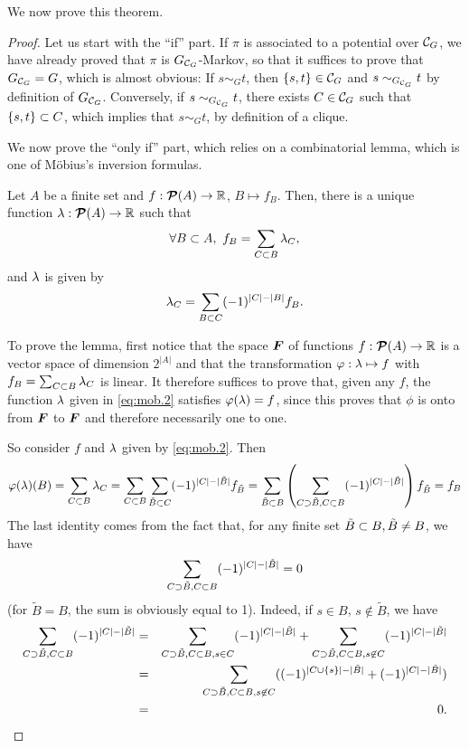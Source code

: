 We now prove this theorem.
\begin{proof}
Let us start with the ``if'' part.
If $\pi$ is associated to a potential over ${\mathcal C}_G$, we have already
proved that $\pi$ is $G_{{\mathcal C}_G}$-Markov, so that it suffices to prove
that $G_{{\mathcal C}_G} = G$, which is almost obvious: If $s\sim_G t$, then
$\{s,t\}\in {\mathcal C}_G$ and $s\sim_{G_{{\mathcal C}_G}} t$ by definition of
$G_{{\mathcal C}_G}$. Conversely, if $s\sim_{G_{{\mathcal C}_G}} t$, there exists $C\in
  {\mathcal C}_G$ such that $\{s,t\}\subset C$, which implies that $s\sim_G t$, by
  definition of a clique.

We now prove the ``only if'' part, which relies on a combinatorial lemma, which is one of
M\"obius's inversion formulas. 
\begin{lemma}
\label{lem:mobius}
Let $A$ be a finite set and $f: {\bm{\mathcal P}({A})}\to
{\mathbb{R}}$, $B\mapsto f_B$. Then, there is a unique function $\lambda: {\bm{\mathcal P}({A})} \to {\mathbb{R}}$ such that
\begin{equation}
\label{eq:mob.1}
\forall B\subset A, \ f_B = \sum_{C\subset B} \lambda_C,
\end{equation}
and $\lambda$ is given by
\begin{equation}
\label{eq:mob.2}
\lambda_C = \sum_{B\subset C} (-1)^{|C|-|B|} f_B.
\end{equation}
\end{lemma}
To prove the lemma, first notice that the space ${\bm{F}}$ of functions $f: {\bm{\mathcal P}({A})}
\to {\mathbb{R}}$ is a vector space of dimension $2^{|A|}$ and that the
transformation $\varphi: \lambda\mapsto f$ with $f_B = \sum_{C\subset B} \lambda_C$ is
linear. It therefore suffices to prove that, given
any $f$, the function $\lambda$ given in \cref{eq:mob.2} satisfies
$\varphi(\lambda)=f$, since this proves that $\phi$ is onto from ${\bm{F}}$ to ${\bm{F}}$
and therefore necessarily one to one.

So consider $f$ and $\lambda$ given by \cref{eq:mob.2}. Then
\[
\varphi(\lambda)(B) =\sum_{C\subset B} \lambda_C = \sum_{C\subset B} \sum_{\tilde B \subset C} (-1)^{|C|-|\tilde B|}
f_{\tilde B}
= \sum_{\tilde B \subset B} \left(\sum_{C \supset \tilde B, C\subset B} (-1)^{|C|-|\tilde B|}\right)
f_{\tilde B}
= f_B
\]
The last identity comes from the fact that, for any finite set $\tilde
B\subset B, \tilde
B\neq B$, we have
$$
\sum_{C \supset \tilde B, C\subset B} (-1)^{|C|-|\tilde B|} = 0
$$
(for $\tilde B=B$, the sum is obviously equal to 1). Indeed, if $s\in
B$, $s\not \in \tilde B$, we have
\begin{eqnarray*}
\sum_{C \supset \tilde B, C\subset B} (-1)^{|C|-|\tilde B|} &=&
\sum_{C \supset \tilde B, C\subset B, s\in C} (-1)^{|C|-|\tilde B|} + \sum_{C \supset \tilde B, C\subset B, s\not\in C} (-1)^{|C|-|\tilde
B|} \\
&=&
\sum_{C \supset \tilde B, C\subset B, s\not \in C} ((-1)^{|C\cup
\{s\}|-|\tilde B|} + (-1)^{|C|-|\tilde
B|}) \\
&=&0.
\end{eqnarray*}


\end{proof}
